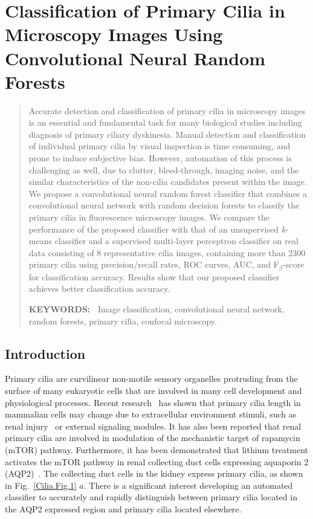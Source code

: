 \chapter{Classification of Primary Cilia in Microscopy Images Using Convolutional Neural Random Forests}

\begin{abstract}
Accurate detection and classification of primary cilia in microscopy images is an essential and fundamental task for many biological studies including diagnosis of primary ciliary dyskinesia. Manual detection and classification of individual primary cilia by visual inspection is time consuming, and prone to induce subjective bias. However, automation of this process is challenging as well, due to clutter, bleed-through, imaging noise, and the similar characteristics of the non-cilia candidates present within the image. We propose a convolutional neural random forest classifier that combines a convolutional neural network with random decision forests to classify the primary cilia in fluorescence microscopy images. We compare the performance of the proposed classifier with that of an unsupervised \emph{k}-means classifier and a supervised multi-layer perceptron classifier on real data consisting of 8 representative cilia images, containing more than 2300 primary cilia using precision/recall rates, ROC curves, AUC, and F$_{\beta}$-score for classification accuracy. Results show that our proposed classifier achieves better classification accuracy.

\textbf{KEYWORDS:\ } Image classification, convolutional neural network, random forests, primary cilia, confocal microscopy.
\end{abstract}

\section{Introduction}
Primary cilia are curvilinear non-motile sensory organelles protruding from the surface of many eukaryotic cells that are involved in many cell development and physiological processes. Recent research~\cite{miyoshi_Lithium_2009} has shown that primary cilia length in mammalian cells may change due to extracellular environment stimuli, such as renal injury~\cite{verghese_Renal_2009} or external signaling modules. It has also been reported that renal primary cilia are involved in modulation of the mechanistic target of rapamycin (mTOR) pathway. Furthermore, it has been demonstrated that lithium treatment activates the mTOR pathway in renal collecting duct cells expressing aquaporin 2 (AQP2)~\cite{gao_Rapamycin_2013}. The collecting duct cells in the kidney express primary cilia, as shown in Fig.~\ref{Cilia.Fig.1} \(a\). There is a significant interest developing an automated classifier to accurately and rapidly distinguish between primary cilia located in the AQP2 expressed region and primary cilia located elsewhere.

